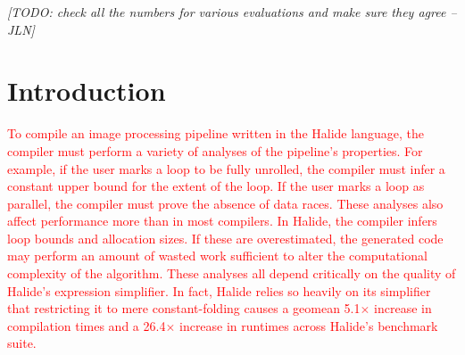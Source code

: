 \documentclass[acmsmall,review]{acmart}\settopmatter{printfolios=true,printccs=false,printacmref=false}
\newcommand{\jln}[1]{\textcolor{uwpurple}{\textit{[{#1} --JLN]}}}
\newcommand{\modified}[1]{\textcolor{red}{{#1}}}
\begin{document}




\maketitle


\jln{TODO: check all the numbers for various evaluations and make sure they agree}
\section{Introduction}
\label{sec:introduction}
\modified{To compile an image processing pipeline written in the
  Halide language, the compiler must perform a variety of analyses of
  the pipeline's properties. For example, if the user marks a
  loop to be fully unrolled, the compiler must infer a constant upper
  bound for the extent of the loop. If the user marks
  a loop as parallel, the compiler must prove the absence of data
  races. These analyses also affect performance more than in most
  compilers. In Halide, the compiler infers loop bounds and allocation sizes.
  If these are overestimated, the generated code may
  perform an amount of wasted work sufficient to alter the
  computational complexity of the algorithm. These analyses all depend
  critically on the quality of Halide's expression simplifier. In
  fact, Halide relies so heavily on its simplifier that restricting it
  to mere constant-folding causes a geomean 5.1$\times$ increase in
  compilation times and a 26.4$\times$ increase in runtimes across
  Halide's benchmark suite.  }

\end{document}
